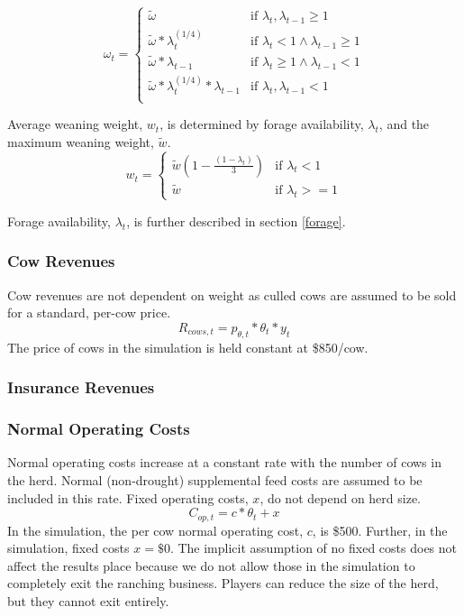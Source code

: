 \documentclass[11pt]{article}
\begin{document}
\begin{equation}
\omega_t =
\begin{cases}
\tilde{\omega}  &\text{if } \lambda_{t}, \lambda_{t-1} \ge 1  \\
\tilde{\omega} * \lambda_{t}^{(1/4)} &\text{if } \lambda_{t} < 1 \land \lambda_{t-1} \ge 1 \\
\tilde{\omega} * \lambda_{t - 1} &\text{if } \lambda_{t} \ge 1 \land \lambda_{t-1} < 1 \\
\tilde{\omega} * \lambda_{t}^{(1/4)} * \lambda_{t-1} &\text{if } \lambda_{t}, \lambda_{t-1} < 1 \\
\end{cases}
\end{equation}

Average weaning weight, $w_t$, is determined by forage availability, $\lambda_t$, and the maximum weaning weight, $\tilde{w}$.
\begin{equation} \label{calfdroughtweight}
w_{t} = 
\begin{cases}
\tilde{w} \left(1 - \frac{(1 - \lambda_t)}{3}\right) & \text{if } \lambda_t < 1 \\
\tilde{w} & \text{if } \lambda_t >= 1
\end{cases}
\end{equation}

Forage availability, $\lambda_t$, is further described in section \ref{forage}.

\subsubsection{Cow Revenues}
Cow revenues are not dependent on weight as culled cows are assumed to be sold for a standard, per-cow price.
\begin{equation}
R_{cows,t} = p_{\theta,t} * \theta_t * y_t 
\end{equation}
The price of cows in the simulation is held constant at \$850/cow.

\subsubsection{Insurance Revenues}

\subsubsection{Normal Operating Costs}
Normal operating costs increase at a constant rate with the number of cows in the herd. Normal (non-drought) supplemental feed costs are assumed to be included in this rate. Fixed operating costs, $x$, do not depend on herd size.
\begin{equation}
C_{op,t} = c * \theta_t + x
\end{equation}
In the simulation, the per cow normal operating cost, $c$, is \$500. Further, in the simulation, fixed costs $x = \$0$. The implicit assumption of no fixed costs does not affect the results place because we do not allow those in the simulation to completely exit the ranching business. Players can reduce the size of the herd, but they cannot exit entirely.
\end{document}
